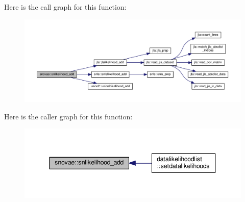 Here is the call graph for this function\+:
\nopagebreak
\begin{figure}[H]
\begin{center}
\leavevmode
\includegraphics[width=350pt]{namespacesnovae_adb4b4cd7d74239d328c3ab34bb17b6eb_cgraph}
\end{center}
\end{figure}
Here is the caller graph for this function\+:
\nopagebreak
\begin{figure}[H]
\begin{center}
\leavevmode
\includegraphics[width=344pt]{namespacesnovae_adb4b4cd7d74239d328c3ab34bb17b6eb_icgraph}
\end{center}
\end{figure}

